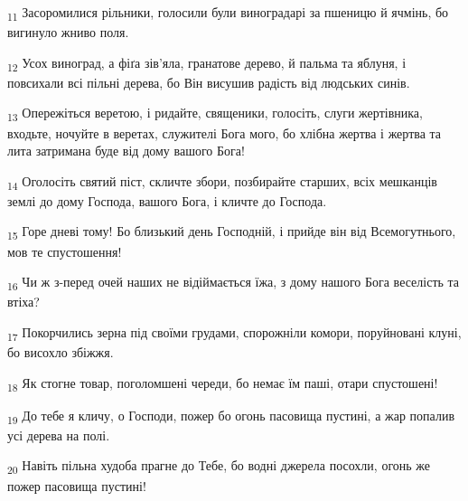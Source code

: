 \begin{tcolorbox}
\textsubscript{11} Засоромилися рільники, голосили були виноградарі за пшеницю й ячмінь, бо вигинуло жниво поля.
\end{tcolorbox}
\begin{tcolorbox}
\textsubscript{12} Усох виноград, а фіґа зів'яла, гранатове дерево, й пальма та яблуня, і повсихали всі пільні дерева, бо Він висушив радість від людських синів.
\end{tcolorbox}
\begin{tcolorbox}
\textsubscript{13} Опережіться веретою, і ридайте, священики, голосіть, слуги жертівника, входьте, ночуйте в веретах, служителі Бога мого, бо хлібна жертва і жертва та лита затримана буде від дому вашого Бога!
\end{tcolorbox}
\begin{tcolorbox}
\textsubscript{14} Оголосіть святий піст, скличте збори, позбирайте старших, всіх мешканців землі до дому Господа, вашого Бога, і кличте до Господа.
\end{tcolorbox}
\begin{tcolorbox}
\textsubscript{15} Горе дневі тому! Бо близький день Господній, і прийде він від Всемогутнього, мов те спустошення!
\end{tcolorbox}
\begin{tcolorbox}
\textsubscript{16} Чи ж з-перед очей наших не відіймається їжа, з дому нашого Бога веселість та втіха?
\end{tcolorbox}
\begin{tcolorbox}
\textsubscript{17} Покорчились зерна під своїми грудами, спорожніли комори, поруйновані клуні, бо висохло збіжжя.
\end{tcolorbox}
\begin{tcolorbox}
\textsubscript{18} Як стогне товар, поголомшені череди, бо немає їм паші, отари спустошені!
\end{tcolorbox}
\begin{tcolorbox}
\textsubscript{19} До тебе я кличу, о Господи, пожер бо огонь пасовища пустині, а жар попалив усі дерева на полі.
\end{tcolorbox}
\begin{tcolorbox}
\textsubscript{20} Навіть пільна худоба прагне до Тебе, бо водні джерела посохли, огонь же пожер пасовища пустині!
\end{tcolorbox}
